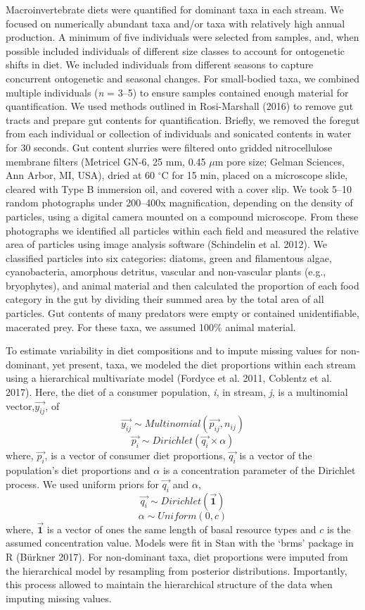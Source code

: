 \documentclass[
]{article}
\begin{document}
Macroinvertebrate diets were quantified for dominant taxa in each
stream. We focused on numerically abundant taxa and/or taxa with
relatively high annual production. A minimum of five individuals were
selected from samples, and, when possible included individuals of
different size classes to account for ontogenetic shifts in diet. We
included individuals from different seasons to capture concurrent
ontogenetic and seasonal changes. For small-bodied taxa, we combined
multiple individuals (\emph{n} = 3--5) to ensure samples contained
enough material for quantification. We used methods outlined in
Rosi-Marshall (2016) to remove gut tracts and prepare gut contents for
quantification. Briefly, we removed the foregut from each individual or
collection of individuals and sonicated contents in water for 30
seconds. Gut content slurries were filtered onto gridded nitrocellulose
membrane filters (Metricel GN-6, 25 mm, 0.45 \(\mu\)m pore size; Gelman
Sciences, Ann Arbor, MI, USA), dried at 60 \(^\circ\)C for 15 min,
placed on a microscope slide, cleared with Type B immersion oil, and
covered with a cover slip. We took 5--10 random photographs under
200--400x magnification, depending on the density of particles, using a
digital camera mounted on a compound microscope. From these photographs
we identified all particles within each field and measured the relative
area of particles using image analysis software (Schindelin et al.
2012). We classified particles into six categories: diatoms, green and
filamentous algae, cyanobacteria, amorphous detritus, vascular and
non-vascular plants (e.g., bryophytes), and animal material and then
calculated the proportion of each food category in the gut by dividing
their summed area by the total area of all particles. Gut contents of
many predators were empty or contained unidentifiable, macerated prey.
For these taxa, we assumed 100\% animal material.

To estimate variability in diet compositions and to impute missing
values for non-dominant, yet present, taxa, we modeled the diet
proportions within each stream using a hierarchical multivariate model
(Fordyce et al. 2011, Coblentz et al. 2017). Here, the diet of a
consumer population, \emph{i}, in stream, \emph{j}, is a multinomial
vector,\(\overrightarrow{y_{ij}}\), of
\[\overrightarrow{y_{ij}} \sim Multinomial(\overrightarrow{p_{ij}}, n_{ij})\]
\[\overrightarrow{p_i} \sim Dirichlet(\overrightarrow{q_i} \times  \alpha) \]
where, \(\overrightarrow{p_i}\), is a vector of consumer diet
proportions, \(\overrightarrow{q_i}\) is a vector of the population's
diet proportions and \(\alpha\) is a concentration parameter of the
Dirichlet process. We used uniform priors for \(\overrightarrow{q_i}\)
and \(\alpha\),
\[\overrightarrow{q_i} \sim Dirichlet(\overrightarrow{\textbf{1}})\]
\[\alpha \sim Uniform(0,\textit{c})\] where,
\(\overrightarrow{\textbf{1}}\) is a vector of ones the same length of
basal resource types and \(\textit{c}\) is the assumed concentration
value. Models were fit in Stan with the `brms' package in R (Bürkner
2017). For non-dominant taxa, diet proportions were imputed from the
hierarchical model by resampling from posterior distributions.
Importantly, this process allowed to maintain the hierarchical structure
of the data when imputing missing values.
\end{document}
